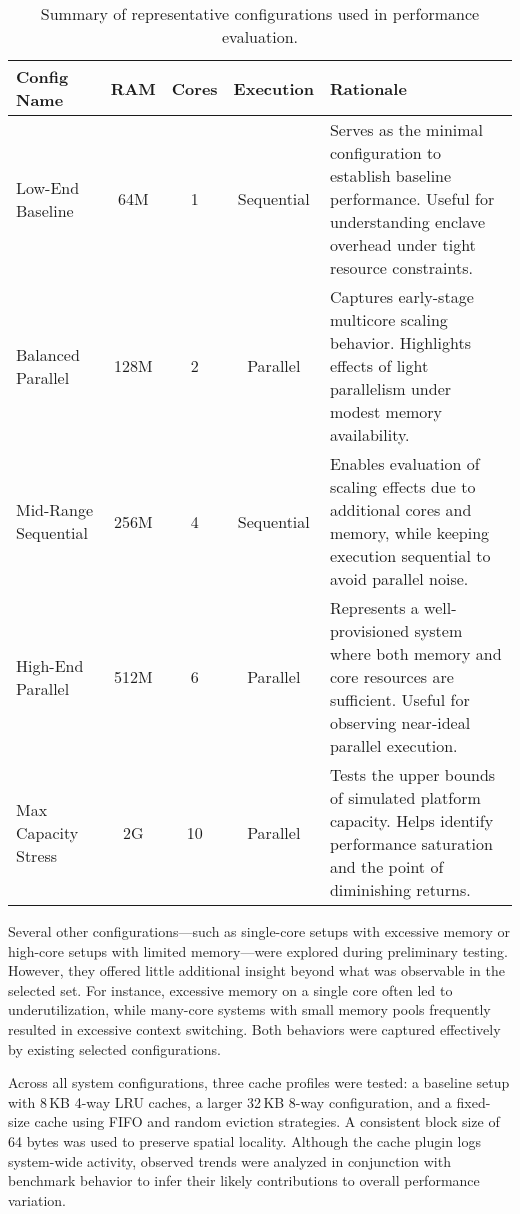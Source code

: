 \begin{table}[h]
\centering
\begin{tabular}{|l|c|c|c|p{7.5cm}|}
\hline
\textbf{Config Name} & \textbf{RAM} & \textbf{Cores} & \textbf{Execution} & \textbf{Rationale} \\
\hline
Low-End Baseline     & 64M         & 1             & Sequential         & Serves as the minimal configuration to establish baseline performance. Useful for understanding enclave overhead under tight resource constraints. \\
\hline
Balanced Parallel    & 128M        & 2             & Parallel           & Captures early-stage multicore scaling behavior. Highlights effects of light parallelism under modest memory availability. \\
\hline
Mid-Range Sequential & 256M        & 4             & Sequential         & Enables evaluation of scaling effects due to additional cores and memory, while keeping execution sequential to avoid parallel noise. \\
\hline
High-End Parallel    & 512M        & 6             & Parallel           & Represents a well-provisioned system where both memory and core resources are sufficient. Useful for observing near-ideal parallel execution. \\
\hline
Max Capacity Stress  & 2G          & 10            & Parallel           & Tests the upper bounds of simulated platform capacity. Helps identify performance saturation and the point of diminishing returns. \\
\hline
\end{tabular}
\caption{Summary of representative configurations used in performance evaluation.}
\end{table}

Several other configurations—such as single-core setups with excessive memory or high-core setups with limited memory—were explored during preliminary testing. However, they offered little additional insight beyond what was observable in the selected set. For instance, excessive memory on a single core often led to underutilization, while many-core systems with small memory pools frequently resulted in excessive context switching. Both behaviors were captured effectively by existing selected configurations.

Across all system configurations, three cache profiles were tested: a baseline setup with 8\,KB 4-way LRU caches, a larger 32\,KB 8-way configuration, and a fixed-size cache using FIFO and random eviction strategies. A consistent block size of 64 bytes was used to preserve spatial locality. Although the cache plugin logs system-wide activity, observed trends were analyzed in conjunction with benchmark behavior to infer their likely contributions to overall performance variation.

